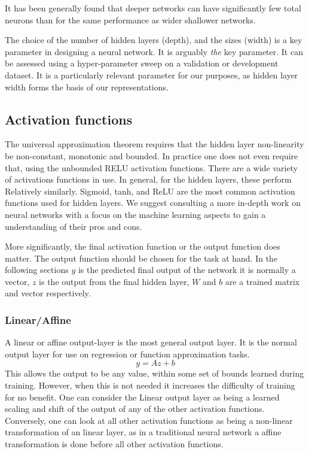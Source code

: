 \documentclass[12pt,parskip]{komatufte}
\begin{document}
It has been generally found that deeper networks can have significantly few total neurons than for the same performance as wider shallower networks.

The choice of the number of hidden layers (depth),
and the sizes (width) is a key parameter in designing a neural network.
It is arguably \emph{the} key parameter.
It can be assessed using a hyper-parameter sweep on a validation or development dataset.
It is a particularly relevant parameter for our purposes, as hidden layer width forms the basis of our representations.



\subsection{Activation functions}

The universal approximation theorem requires that the hidden layer non-linearity be non-constant, monotonic and bounded.
In practice one does not even require that, using the unbounded RELU activation functions.
There are a wide variety of activations functions in use.
In general, for the hidden layers, these perform Relatively similarly.
Sigmoid, tanh, and ReLU are the most common activation functions used for hidden layers.
We suggest consulting a more in-depth work on neural networks with a focus on the machine learning aspects to gain a understanding of their pros and cons.

More significantly, the final activation function or the output function does matter.
The output function should be chosen for the task at hand.
In the following sections $y$ is the predicted final output of the network it is normally a vector,
$z$ is the output from the final hidden layer,
$W$ and $b$ are a trained matrix and vector respectively.

\subsubsection{Linear/Affine}
A linear or affine output-layer is the most general output layer.
It is the normal output layer for use on regression or function approximation tasks.
\begin{equation}
y=Az + b
\end{equation}
This allows the output to be any value, within some set of bounds learned during training.
However, when this is not needed it increases the difficulty of training for no benefit.
One can consider the Linear output layer as being a learned scaling and shift of the output of any of the other activation functions.
Conversely, one can look at all other activation functions as being a non-linear transformation of an linear layer, as in a traditional neural network a affine transformation is done before all other activation functions.
\end{document}

